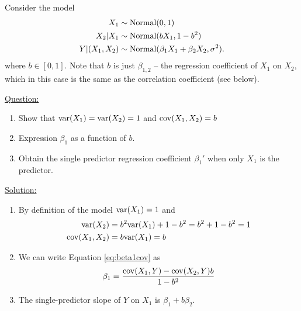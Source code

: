 \begin{example}\label{ex:normal_pred}
Consider the model
\begin{align*}
X_1 &\sim {\rm Normal}(0,1)\\
X_2|X_1 &\sim {\rm Normal}(bX_1,1-b^2)\\
Y|(X_1,X_2) & \sim {\rm Normal}(\beta_1X_1 + \beta_2X_2,\sigma^2). 
\end{align*}
where $b \in [0,1]$. Note that $b$ is just $\beta_{1,2}$ -- the regression coefficient of $X_1$ on $X_2$, which in this case is the same as the correlation coefficient (see below). 


\noindent
\underline{Question:} 
\begin{enumerate}[label=(\alph*)]
\item Show that ${\rm var}(X_1) = {\rm var}(X_2) = 1$ and ${\rm cov}(X_1,X_2)=b$
\item Expression $\beta_1$ as a function of $b$. 
\item Obtain the single predictor regression coefficient $\beta_1'$ when only $X_1$ is the predictor. 
\end{enumerate}



\noindent
\underline{Solution:} 
\begin{enumerate}[label=(\alph*)]
\item By definition of the model ${\rm var}(X_1)=1$ and 
\begin{align*}
{\rm var}(X_2) &= b^2{\rm var}(X_1) + 1-b^2 = b^2+1-b^2 = 1\\
{\rm cov}(X_1,X_2) &= b{\rm var}(X_1) = b
\end{align*}
\item We can write Equation \ref{eq:beta1cov} as
\begin{equation*}
\beta_1 =  \frac{ {\rm cov}(X_1,Y)- {\rm cov}(X_2,Y)b}{1 -b^2}
\end{equation*}
\item The single-predictor slope of $Y$ on $X_1$ is $\beta_1 + b \beta_2$. 
\end{enumerate}


\end{example}


